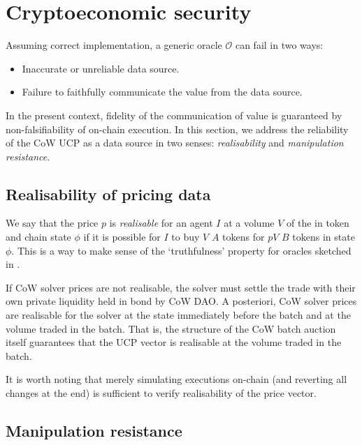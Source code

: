 \documentclass[a4paper,10pt]{article}
\theoremstyle{remark}
\newcommand \oracle {\mathcal{O}}
\begin{document}
\section{Cryptoeconomic security}
\label{security}

Assuming correct implementation, a generic oracle $\oracle$ can fail in two ways:
\begin{itemize}
  \item Inaccurate or unreliable data source.
  \item Failure to faithfully communicate the value from the data source.
\end{itemize}
In the present context, fidelity of the communication of value is guaranteed by non-falsifiability of on-chain execution.
%
In this section, we address the reliability of the CoW UCP as a data source in two senses: \emph{realisability} and \emph{manipulation resistance}.

\subsection{Realisability of pricing data}
\label{realisable}

We say that the price $p$ is \emph{realisable} for an agent $I$ at a volume $V$ of the in token and chain state $\phi$ if it is possible for $I$ to buy $V$ $A$ tokens for $pV$ $B$ tokens in state $\phi$.
%
This is a way to make sense of the `truthfulness' property for oracles sketched in \cite{heiss2019oracles}.

If CoW solver prices are not realisable, the solver must settle the trade with their own private liquidity held in bond by CoW DAO.
%
A posteriori, CoW solver prices are realisable for the solver at the state immediately before the batch and at the volume traded in the batch.
%
That is, the structure of the CoW batch auction itself guarantees that the UCP vector is realisable at the volume traded in the batch.

It is worth noting that merely simulating executions on-chain (and reverting all changes at the end) is sufficient to verify realisability of the price vector.

\subsection{Manipulation resistance}
\label{manipulation}
\end{document}
